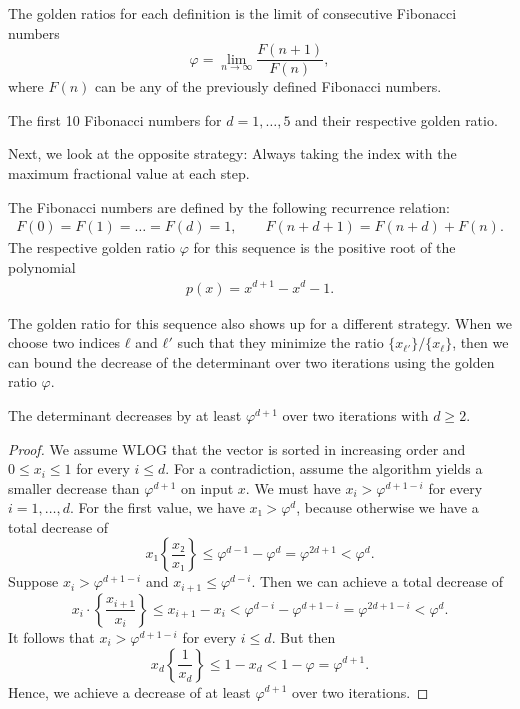 The golden ratios for each definition is the limit of consecutive Fibonacci numbers
\[
  φ = \lim_{n → ∞} \frac{F(n + 1)}{F(n)},
\]
where $F(n)$ can be any of the previously defined Fibonacci numbers.

\iffalse
\section{Higher-Order Fibonacci Sequence for the Maximum Strategy}
\fi

\begin{table}[tbp]
  \caption{The first 10 Fibonacci numbers for $d = 1, …, 5$ and their respective golden ratio.}
  \label{tbl:max-fibonacci}
  \centering
  
\end{table}

Next, we look at the opposite strategy:
Always taking the index with the maximum fractional value at each step.

The Fibonacci numbers are defined by the following recurrence relation:
\begin{align*}
  F(0) = F(1) = \dots = F(d) = 1, \qquad F(n + d + 1) = F(n + d) + F(n).
\end{align*}
The respective golden ratio $φ$ for this sequence is the positive root of the polynomial
\begin{align*}
  p(x) = x^{d+1} - x^d - 1.
\end{align*}

The golden ratio for this sequence also shows up for a different strategy.
When we choose two indices $ℓ$ and $ℓ'$ such that they minimize the ratio
$\{x_{ℓ'}\}/\{x_{ℓ}\}$, then we can bound the decrease of the determinant over
two iterations using the golden ratio $φ$.

\begin{theorem}
  The determinant decreases by at least $φ^{d+1}$ over two iterations with $d ≥ 2$.
\end{theorem}

\begin{proof}
  We assume WLOG that the vector is sorted in increasing order and
  $0 ≤ x_i ≤ 1$ for every $i ≤ d$.
  For a contradiction, assume the algorithm yields a smaller decrease than $φ^{d+1}$ on input $x$.
  We must have $x_i > φ^{d+1-i}$ for every $i = 1, \dots, d$.
  For the first value, we have $x₁ > φ^d$, because otherwise we have a total decrease of
  \[
    x₁ \left\{ \frac{x₂}{x₁} \right\} ≤ φ^{d-1} - φ^d = φ^{2d+1} < φ^d.
  \]
  Suppose $x_i > φ^{d+1-i}$ and $x_{i+1} ≤ φ^{d-i}$.
  Then we can achieve a total decrease of
  \[
    x_i · \left\{ \frac{x_{i+1}}{x_i} \right\} ≤ x_{i+1} - x_i < φ^{d-i} - φ^{d+1-i} = φ^{2d+1-i} < φ^d.
  \]
  It follows that $x_i > φ^{d+1-i}$ for every $i ≤ d$.
  But then
  \[
    x_d \left\{ \frac{1}{x_d} \right\} ≤ 1 - x_d < 1 - φ = φ^{d+1}.
  \]
  Hence, we achieve a decrease of at least $φ^{d+1}$ over two iterations.
\end{proof}

